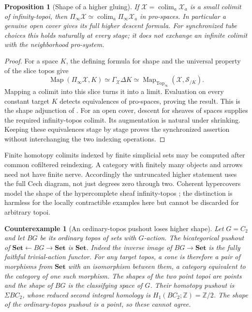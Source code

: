 \documentclass[11pt,a4paper]{article}
\newtheorem{proposition}[theorem]{Proposition}
\newtheorem{counterexample}[theorem]{Counterexample}
\theoremstyle{definition}
\newcommand{\Map}{\operatorname{Map}}
\newcommand{\colim}{\operatorname*{colim}}
\begin{document}
\begin{proposition}[Shape of a higher gluing]\label{prop:shape}
If $\mathcal X=\colim_a\mathcal X_a$ is a small colimit of
infinity-topoi, then
$\Pi_\infty\mathcal X\simeq\colim_a\Pi_\infty\mathcal X_a$
in pro-spaces. In particular a genuine open cover gives its full
higher descent formula. For synchronized tube choices this holds
naturally at every stage; it does not exchange an infinite colimit
with the neighborhood pro-system.
\end{proposition}
\begin{proof}
For a space $K$, the defining formula for shape and the universal
property of the slice topos give
\[
 \Map(\Pi_\infty\mathcal X,K)
 \simeq\Gamma_{\mathcal X}\Delta K
 \simeq\Map_{\operatorname{Top}_\infty}(\mathcal X,\mathcal S_{/K}).
\]
Mapping a colimit into this slice turns it into a limit. Evaluation
on every constant target $K$ detects equivalences of pro-spaces,
proving the result. This is the shape adjunction of
\cite[Remark~7.1.6.15]{HTT}. For an open cover, descent for sheaves
of spaces supplies the required infinity-topos colimit. Its
augmentation is natural under shrinking. Keeping these equivalences
stage by stage proves the synchronized assertion without interchanging
the two indexing operations.
\end{proof}
Finite homotopy colimits indexed by finite simplicial sets may be
computed after common cofiltered reindexing. A category with finitely
many objects and arrows need not have finite nerve. Accordingly the
untruncated higher statement uses the full Cech diagram, not just
degrees zero through two. Coherent hypercovers model the shape of
the hypercomplete sheaf infinity-topos \cite[Proposition~5.1]{Hoyois};
the distinction is harmless for the locally contractible examples
here but cannot be discarded for arbitrary topoi.

\begin{counterexample}[An ordinary-topos pushout loses higher shape]\label{ex:ordinary-shape}
Let $G=C_2$ and let $BG$ be its ordinary topos of sets with $G$-action.
The bicategorical pushout of $\mathbf{Set}\leftarrow BG\to
\mathbf{Set}$ is $\mathbf{Set}$. Indeed the inverse image of
$BG\to\mathbf{Set}$ is the fully faithful trivial-action functor.
For any target topos, a cone is therefore a pair of morphisms from
$\mathbf{Set}$ with an isomorphism between them, a category equivalent
to the category of one such morphism. The shapes of the two point
topoi are points and the shape of $BG$ is the classifying space of
$G$. Their homotopy pushout is $\Sigma BC_2$, whose reduced second
integral homology is $H_1(BC_2;\mathbb Z)=\mathbb Z/2$. The shape of
the ordinary-topos pushout is a point, so these cannot agree.
\end{counterexample}
\end{document}
